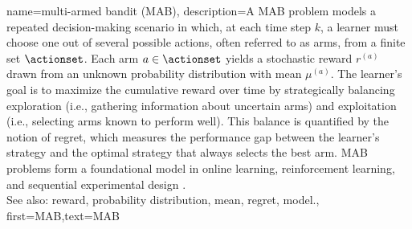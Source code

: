 {name={multi-armed bandit (MAB)},
	description={A MAB problem models 
		a repeated decision-making scenario in which, at each time step $k$, a learner must 
		choose one out of several possible actions, often referred to as arms, from a finite 
		set $\actionset$. Each arm $a \in \actionset$ yields a stochastic reward $r^{(a)}$ 
		drawn from an unknown probability distribution with mean $\mu^{(a)}$. 
		The learner’s goal is to maximize the cumulative reward over time by 
		strategically balancing exploration (i.e., gathering information about 
		uncertain arms) and exploitation (i.e., selecting arms known to perform well). 
		This balance is quantified by the notion of regret, which measures the performance 
		gap between the learner's strategy and the optimal strategy that always selects the best arm. 
		MAB problems form a foundational model in online learning, reinforcement learning, 
		and sequential experimental design \cite{Bubeck2012}.
					\\ 
		See also: reward, probability distribution, mean, regret, model.},
	first={MAB},text={MAB}
}



